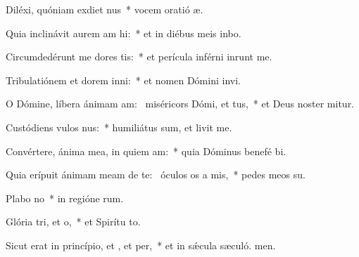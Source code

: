 \item Diléxi, quóniam exdiet nus~* vocem oratió æ.
\item Quia inclinávit aurem am hi:~* et in diébus meis inbo.
\item Circumdedérunt me dores tis:~* et perícula inférni inrunt me.
\item Tribulatiónem et dorem inni:~* et nomen Dómini invi.
\item O Dómine, líbera ánimam am:~\pscross{} miséricors Dómi, et tus,~* et Deus noster mitur.
\item Custódiens vulos nus:~* humiliátus sum, et livit me.
\item Convértere, ánima mea, in quiem am:~* quia Dóminus benefé bi.
\item Quia erípuit ánimam meam de te:~\pscross{} óculos os a mis,~* pedes meos  su.
\item Plabo no~* in regióne rum.
\item Glória tri, et o,~* et Spirítu to.
\item Sicut erat in princípio, et , et per,~* et in sǽcula sæculó. men.

